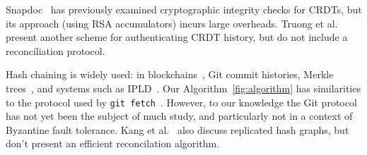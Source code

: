 \documentclass[a4paper,anonymous,USenglish]{lipics-v2019}
\begin{document}
Snapdoc~\cite{Kollmann:2019hf} has previously examined cryptographic integrity checks for CRDTs, but its approach (using RSA accumulators) incurs large overheads.
Truong et al.~\cite{Truong:2012et} present another scheme for authenticating CRDT history, but do not include a reconciliation protocol.

Hash chaining is widely used: in blockchains~\cite{Bano:2019}, Git commit histories, Merkle trees~\cite{Merkle:1987}, and systems such as IPLD~\cite{IPLD}.
Our Algorithm~\ref{fig:algorithm} has similarities to the protocol used by \texttt{git fetch}~\cite{GitHTTP}.
However, to our knowledge the Git protocol has not yet been the subject of much study, and particularly not in a context of Byzantine fault tolerance.
Kang et al.~\cite{Kang:2003} also discuss replicated hash graphs, but don't present an efficient reconcilation algorithm.











\end{document}
